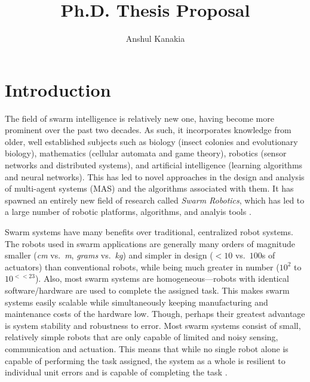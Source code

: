\documentclass[11pt, onecolumn, compsoc, letterpaper]{article}
\begin{document}
\title{Ph.D. Thesis Proposal}
\author{Anshul Kanakia}

\maketitle

\section{Introduction}
The field of swarm intelligence is relatively new one, having become more prominent over the past two decades. As such, it incorporates knowledge from older, well established subjects such as biology (insect colonies and evolutionary biology), mathematics (cellular automata and game theory), robotics (sensor networks and distributed systems), and artificial intelligence (learning algorithms and neural networks). This has led to novel approaches in the design and analysis of multi-agent systems (MAS) and the algorithms associated with them. It has spawned an entirely new field of research called \emph{Swarm Robotics}\cite{Sahin2005}, which has led to a large number of robotic platforms, algorithms, and analyis tools \cite{Brambilla2013}.

Swarm systems have many benefits over traditional, centralized robot systems. The robots used in swarm applications are generally many orders of magnitude smaller (\emph{cm} vs.~\emph{m}, \emph{grams} vs.~\emph{kg}) and simpler in design ($<10$ vs.~$100$s of actuators) than conventional robots, while being much greater in number ($10^2$ to $10^{<<23}$). Also, most swarm systems are homogeneous---robots with identical software/hardware are used to complete the assigned task. This makes swarm systems easily scalable while simultaneously keeping manufacturing and maintenance costs of the hardware low. Though, perhaps their greatest advantage is system stability and robustness to error. Most swarm systems consist of small, relatively simple robots that are only capable of limited and noisy sensing, communication and actuation. This means that while no single robot alone is capable of performing the task assigned, the system as a whole is resilient to individual unit errors and is capable of completing the task \cite{Winfield2005}.
\end{document}
